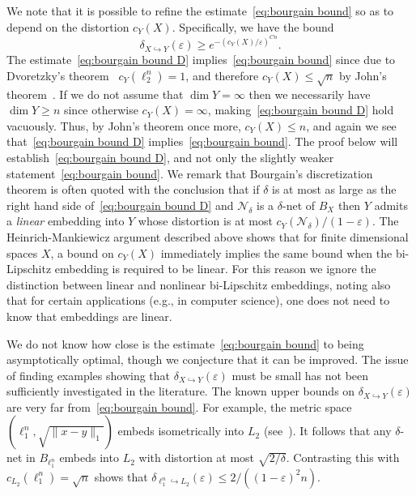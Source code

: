 \documentclass[12pt,reqno]{amsart}
\theoremstyle{plain}
\theoremstyle{definition}
\newcommand{\e}{\varepsilon}
\renewcommand{\d}{\delta}
\renewcommand{\le}{\leqslant}
\renewcommand{\ge}{\geqslant}
\begin{document}
We note that it is possible to refine the estimate~\eqref{eq:bourgain bound} so as to depend on the distortion $c_Y(X)$. Specifically, we have the bound
\begin{equation}\label{eq:bourgain bound D}
\d_{X\hookrightarrow Y}(\e)\ge e^{-(c_Y(X)/\e)^{Cn}}.
\end{equation}
The estimate~\eqref{eq:bourgain bound D} implies~\eqref{eq:bourgain bound} since due to Dvoretzky's theorem~\cite{Dvo60}  $c_Y(\ell_2^n)=1$, and therefore $c_Y(X)\le \sqrt{n}$ by John's theorem~\cite{Jo}. If we do not assume that $\dim Y=\infty$ then we necessarily have $\dim Y\ge n$ since otherwise $c_Y(X)=\infty$, making~\eqref{eq:bourgain bound D} hold vacuously. Thus, by John's theorem once more, $c_Y(X)\le n$, and again we see that~\eqref{eq:bourgain bound D} implies~\eqref{eq:bourgain bound}. The proof below will establish~\eqref{eq:bourgain bound D}, and not only the slightly weaker statement~\eqref{eq:bourgain bound}. We remark that Bourgain's discretization theorem is often quoted with the conclusion that if $\delta$ is at most as large as the right hand side of~\eqref{eq:bourgain bound D} and $\mathcal N_\d$ is a $\d$-net  of $B_X$ then $Y$ admits a {\em linear} embedding into $Y$ whose distortion is at most $c_Y(\mathcal N_\delta)/(1-\e)$. The Heinrich-Mankiewicz argument described above shows that for finite dimensional spaces $X$, a bound on $c_Y(X)$ immediately implies the same bound when the bi-Lipschitz embedding is required to be linear. For this reason we ignore the distinction between linear and nonlinear bi-Lipschitz embeddings, noting also that for certain applications (e.g., in computer science), one does not need to know that embeddings are linear.



We do not know how close is the estimate~\eqref{eq:bourgain bound} to being asymptotically optimal, though we conjecture that it can be improved. The issue of finding examples showing that $\d_{X\hookrightarrow Y}(\e)$ must be small has not been sufficiently investigated in the literature. The known upper bounds on $\d_{X\hookrightarrow Y}(\e)$ are very far from~\eqref{eq:bourgain bound}. For example, the metric space $(\ell_1^n,\sqrt{\|x-y\|_1})$ embeds isometrically into $L_2$ (see~\cite{DL97}). It follows that any $\d$-net in $B_{\ell_1^n}$ embeds into $L_2$ with distortion at most $\sqrt{2/\d}$. Contrasting this with $c_{L_2}(\ell_1^n)=\sqrt{n}$ shows  that $\delta_{\ell_1^n\hookrightarrow L_2}(\e)\le 2/\left((1-\e)^2n\right)$.
\end{document}
